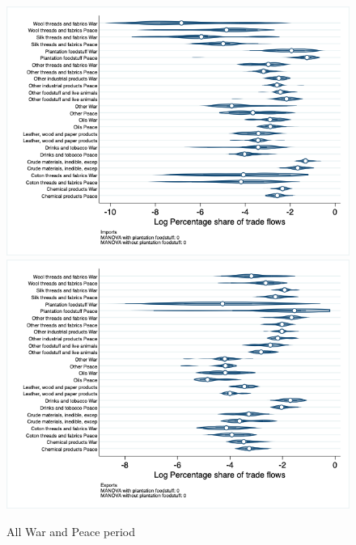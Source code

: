 \documentclass[12pt,a4paper,notitlepage,english]{article}
\begin{document}
\begin{figure}
\caption{All War and Peace period}
\label{peace_war_nat_distr}
\includegraphics[scale=.4]{peace_war_nat_distr_I}
\includegraphics[scale=.4]{peace_war_nat_distr_X}
\end{figure}
\end{document}
